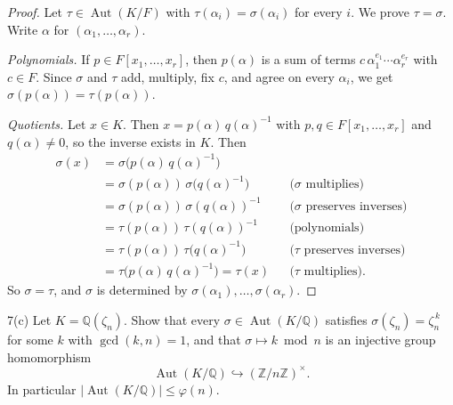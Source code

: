 \documentclass[11pt]{article}
\begin{document}
\begin{proof}
Let $\tau \in \operatorname{Aut}(K/F)$ with $\tau(\alpha_i) = \sigma(\alpha_i)$
for every $i$. We prove $\tau = \sigma$. Write $\alpha$ for
$(\alpha_1, \dots, \alpha_r)$.

\emph{Polynomials.} If $p \in F[x_1, \dots, x_r]$, then $p(\alpha)$ is a sum of
terms $c\,\alpha_1^{e_1}\cdots\alpha_r^{e_r}$ with $c \in F$. Since $\sigma$ and
$\tau$ add, multiply, fix $c$, and agree on every $\alpha_i$, we get
$\sigma(p(\alpha)) = \tau(p(\alpha))$.

\emph{Quotients.} Let $x \in K$. Then $x = p(\alpha)\,q(\alpha)^{-1}$ with
$p, q \in F[x_1, \dots, x_r]$ and $q(\alpha) \neq 0$, so the inverse exists in
$K$. Then
\begin{align*}
  \sigma(x)
    &= \sigma\bigl(p(\alpha)\,q(\alpha)^{-1}\bigr) \\
    &= \sigma(p(\alpha))\,\sigma\bigl(q(\alpha)^{-1}\bigr) && \text{($\sigma$ multiplies)} \\
    &= \sigma(p(\alpha))\,\sigma(q(\alpha))^{-1} && \text{($\sigma$ preserves inverses)} \\
    &= \tau(p(\alpha))\,\tau(q(\alpha))^{-1} && \text{(polynomials)} \\
    &= \tau(p(\alpha))\,\tau\bigl(q(\alpha)^{-1}\bigr) && \text{($\tau$ preserves inverses)} \\
    &= \tau\bigl(p(\alpha)\,q(\alpha)^{-1}\bigr) = \tau(x) && \text{($\tau$ multiplies)}.
\end{align*}
So $\sigma = \tau$, and $\sigma$ is determined by
$\sigma(\alpha_1), \dots, \sigma(\alpha_r)$.
\end{proof}

\begin{problem}{7(c)}
  Let $K = \mathbb{Q}(\zeta_n)$. Show that every
  $\sigma \in \operatorname{Aut}(K/\mathbb{Q})$ satisfies
  $\sigma(\zeta_n) = \zeta_n^{\,k}$ for some $k$ with $\gcd(k,n) = 1$, and that
  $\sigma \mapsto k \bmod n$ is an injective group homomorphism
  \[
    \operatorname{Aut}(K/\mathbb{Q}) \hookrightarrow (\mathbb{Z}/n\mathbb{Z})^{\times} .
  \]
  In particular $\lvert \operatorname{Aut}(K/\mathbb{Q}) \rvert \leq \varphi(n)$.
\end{problem}
\end{document}

